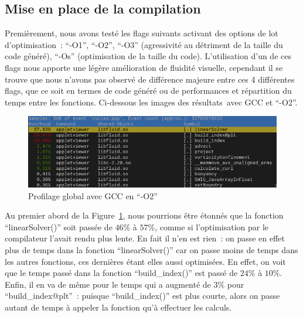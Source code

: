 \documentclass[12pt,a4paper]{article}
\begin{document}
\subsection{Mise en place de la compilation}
\label{sub.optim.compil}

Premièrement, nous avons testé les flags suivants activant des options de lot
d'optimisation : \enquote{-O1}, \enquote{-O2}, \enquote{-O3} (agressivité au
détriment de la taille du code généré), \enquote{-Os} (optimisation de la taille
du code). L'utilisation d'un de ces flags nous apporte une légère amélioration
de fluidité visuelle, cependant il se trouve que nous n'avons pas observé de
différence majeure entre ces 4 différentes flags, que ce soit en termes de code
généré ou de performances et répartition du temps entre les fonctions.
Ci-dessous les images des résultats avec \ac{GCC} et \enquote{-O2}.

\begin{figure}
    \centering
    \includegraphics[scale=0.58]{figures/optims/gcc-O2/global.png}
    \caption{Profilage global avec \ac{GCC} en \enquote{-O2}}
    \label{fig.optim.compil.gcc.global}
\end{figure}

Au premier abord de la Figure~\ref{fig.optim.compil.gcc.global}, nous pourrions
être étonnés que la fonction \enquote{linearSolver()} soit passée de $46\%$ à
$57\%$, comme si l'optimisation par le compilateur l'avait rendu plus lente. En
fait il n'en est rien : on passe en effet plus de temps dans la fonction
\enquote{linearSolver()} car on passe moins de temps dans les autres fonctions,
ces dernières étant elles aussi optimisées. En effet, on voit que le temps passé
dans la fonction \enquote{build\_index()} est passé de $24\%$ à $10\%$. Enfin,
il en va de même pour le temps qui a augmenté de $3\%$ pour
\enquote{build\_index@plt} : puisque \enquote{build\_index()} est plus courte,
alors on passe autant de temps à appeler la fonction qu'à effectuer les calculs.
\end{document}
